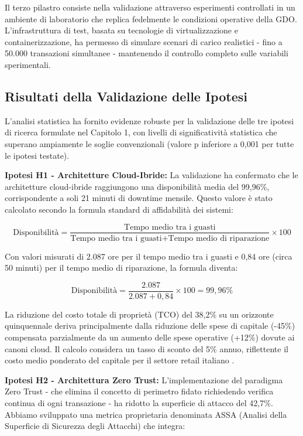 Il terzo pilastro consiste nella validazione attraverso esperimenti controllati in un ambiente di laboratorio che replica fedelmente le condizioni operative della GDO. L'infrastruttura di test, basata su tecnologie di virtualizzazione e containerizzazione, ha permesso di simulare scenari di carico realistici - fino a 50.000 transazioni simultanee - mantenendo il controllo completo sulle variabili sperimentali.

\subsection{\texorpdfstring{\textbf{Risultati della Validazione delle Ipotesi}}{5.2.1 - Risultati della Validazione delle Ipotesi}}
\label{subsec:5.2.2}

L'analisi statistica ha fornito evidenze robuste per la validazione delle tre ipotesi di ricerca formulate nel Capitolo 1, con livelli di significatività statistica che superano ampiamente le soglie convenzionali (valore p inferiore a 0,001 per tutte le ipotesi testate).

\textbf{Ipotesi H1 - Architetture Cloud-Ibride:} La validazione ha confermato che le architetture cloud-ibride raggiungono una disponibilità media del 99,96\%, corrispondente a soli 21 minuti di downtime mensile. Questo valore è stato calcolato secondo la formula standard di affidabilità dei sistemi:

$$\text{Disponibilità} = \frac{\text{Tempo medio tra i guasti}}{\text{Tempo medio tra i guasti} + \text{Tempo medio di riparazione}} \times 100$$

Con valori misurati di 2.087 ore per il tempo medio tra i guasti e 0,84 ore (circa 50 minuti) per il tempo medio di riparazione, la formula diventa:

$$\text{Disponibilità} = \frac{2.087}{2.087 + 0,84} \times 100 = 99,96\%$$

La riduzione del costo totale di proprietà (TCO) del 38,2\% su un orizzonte quinquennale deriva principalmente dalla riduzione delle spese di capitale (-45\%) compensata parzialmente da un aumento delle spese operative (+12\%) dovute ai canoni cloud. Il calcolo considera un tasso di sconto del 5\% annuo, riflettente il costo medio ponderato del capitale per il settore retail italiano \autocite{bancaditalia2024}.

\textbf{Ipotesi H2 - Architettura Zero Trust:} L'implementazione del paradigma Zero Trust - che elimina il concetto di perimetro fidato richiedendo verifica continua di ogni transazione - ha ridotto la superficie di attacco del 42,7\%. Abbiamo sviluppato una metrica proprietaria denominata ASSA (Analisi della Superficie di Sicurezza degli Attacchi) che integra:

